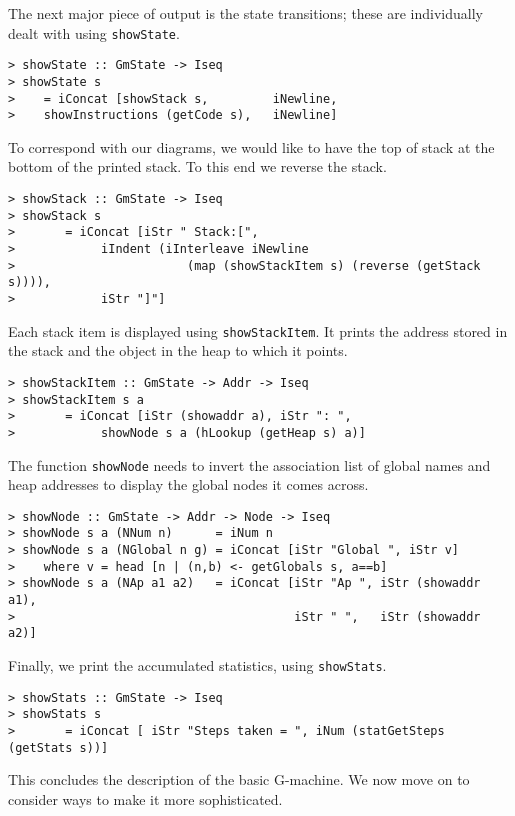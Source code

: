 %
%
%
%
%
%
%
\par
The next major piece of output is the state transitions; these are
individually dealt with using \mbox{\tt showState}.
\begin{verbatim}
> showState :: GmState -> Iseq
> showState s
>    = iConcat [showStack s,         iNewline,
>    showInstructions (getCode s),   iNewline]
\end{verbatim}
%
%
To correspond with our diagrams, we would like to have the top of
stack at the bottom of the printed stack. To this end we reverse the
stack.
\begin{verbatim}
> showStack :: GmState -> Iseq
> showStack s
>       = iConcat [iStr " Stack:[",
>            iIndent (iInterleave iNewline
>                        (map (showStackItem s) (reverse (getStack s)))),
>            iStr "]"]
\end{verbatim}
%
%
\par
Each stack item is displayed using \mbox{\tt showStackItem}. It prints the
address stored in the stack and the object in the heap to which it
points.
\begin{verbatim}
> showStackItem :: GmState -> Addr -> Iseq
> showStackItem s a
>       = iConcat [iStr (showaddr a), iStr ": ",
>            showNode s a (hLookup (getHeap s) a)]
\end{verbatim}
%
%
\par
The function \mbox{\tt showNode} needs to invert the association list of global
names and heap addresses to display the global nodes it comes across.
\begin{verbatim}
> showNode :: GmState -> Addr -> Node -> Iseq
> showNode s a (NNum n)      = iNum n
> showNode s a (NGlobal n g) = iConcat [iStr "Global ", iStr v]
>    where v = head [n | (n,b) <- getGlobals s, a==b]
> showNode s a (NAp a1 a2)   = iConcat [iStr "Ap ", iStr (showaddr a1),
>                                       iStr " ",   iStr (showaddr a2)]
\end{verbatim}
%
%
%
%
\par
Finally, we print the accumulated statistics, using \mbox{\tt showStats}.
\begin{verbatim}
> showStats :: GmState -> Iseq
> showStats s
>       = iConcat [ iStr "Steps taken = ", iNum (statGetSteps (getStats s))]
\end{verbatim}
%
%
\par
This concludes the description of the basic G-machine. We now move on
to consider ways to make it more sophisticated.

